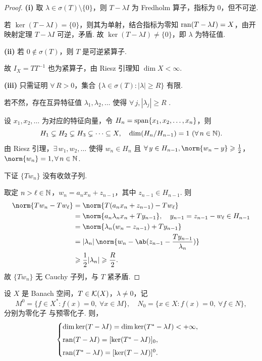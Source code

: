 \begin{proof}
\textbf{(i)} 取 $\lambda \in \sigma(T)\setminus\{0\}$，则 $T-\lambda I$ 为 Fredholm 算子，指标为 $0$，但不可逆. \par
若 $\ker(T-\lambda I) = \{0\}$，则其为单射，结合指标为零知 $\operatorname{ran}(T-\lambda I) = X$，由开映射定理 $T-\lambda I$ 可逆，矛盾. 故 $\ker(T-\lambda I) \neq \{0\}$，即 $\lambda$ 为特征值.\par
\textbf{(ii)} 若 $0 \notin \sigma(T)$，则 $T$ 是可逆紧算子.\par
 故 $I_X = TT^{-1}$ 也为紧算子，由 Riesz 引理知 $\dim X < \infty$.\par
\textbf{(iii)} 只需证明 $\forall\, R>0$，集合 $\{\lambda \in \sigma(T): |\lambda| \geq R\}$ 有限.\par
若不然，存在互异特征值 $\lambda_1, \lambda_2, \dots$ 使得 $\forall\, j,|\lambda_j| \geq R$ . \par
设 $x_1, x_2, \dots$ 为对应的特征向量，令 $H_n = \operatorname{span}\{x_1,x_2,\dots,x_n\}$，则
\begin{equation*}
H_1 \subsetneq H_2 \subsetneq H_3 \subsetneq \cdots \subseteq X,\quad \dim(H_n/H_{n-1}) = 1\ (\forall\, n \in \mathbb{N}).
\end{equation*}
由 Riesz 引理，$\exists\, w_1, w_2, \dots$ 使得 $w_n \in H_n$ 且 $\forall\, y \in H_{n-1},\norm{w_n - y} \geq \frac{1}{2}$，$\norm{w_n}=1,\forall\, n \in \mb{N}$.\par
下证 $\{Tw_n\}$ 没有收敛子列.\par
取定 $n > \ell \in \mathbb{N}$，$w_n = a_n x_n + z_{n-1}$，其中 $z_{n-1} \in H_{n-1}$. 则
\begin{align*}
\norm{Tw_n - Tw_\ell}
&= \norm{T(a_n x_n + z_{n-1}) - Tw_\ell}\\
&= \norm{a_n \lambda_n x_n + Ty_{n-1}},\quad y_{n-1} = z_{n-1} - w_\ell \in H_{n-1}\\
&= \norm{\lambda_n(w_n - z_{n-1}) + Ty_{n-1}}\\
&= |\lambda_n| \,\norm{w_n - \ab(z_{n-1} - \frac{Ty_{n-1}}{\lambda_n})}\\
&\geq \frac{1}{2}|\lambda_n| \geq \frac{R}{2}.
\end{align*}
故 $\{Tw_n\}$ 无 Cauchy 子列，与 $T$ 紧矛盾.
\end{proof}

\begin{theorem}\label{thm:riesz-schauder}
设 $X$ 是 Banach 空间，$T \in \mathcal{K}(X)$，$\lambda \neq 0$，记
\begin{equation*}
M^0 = \{f \in X^*: f(x)=0,\ \forall x \in M\},\quad
N_0 = \{x \in X: f(x)=0,\ \forall f \in N\},
\end{equation*}
分别为零化子 与预零化子. 则，
\begin{equation*}
\begin{cases}
\dim \ker(T-\lambda I) = \dim \ker(T^*-\lambda I) < +\infty,\\[4pt]
\operatorname{ran}(T-\lambda I) = [\ker(T^*-\lambda I)]_0,\\[4pt]
\operatorname{ran}(T^*-\lambda I) = [\ker(T-\lambda I)]^0.
\end{cases}
\end{equation*}
\end{theorem}

